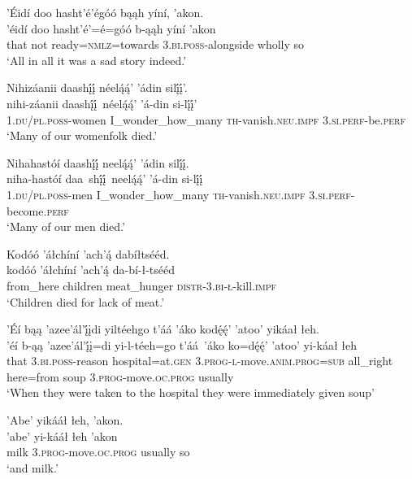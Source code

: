 \ea\label{ex:text7-14-11}
’Éidí doo hasht’é’égóó bąąh yíní, ’akon.\\
\gll ’éidí	doo	hasht’é’=é=góó	b-ąąh	yíní	’akon\\
     that	not	ready=\textsc{nmlz}=towards	3.\textsc{bi}.\textsc{poss}-alongside	wholly	so\\
\glt `All in all it was a sad story indeed.'
\z

\ea\label{ex:text7-14-12}
Nihizáanii daashį́į́ néelą́ą́’ ’ádin silį́į́’.\\
\gll nihi-záanii	daashį́į́~{néelą́ą́’}	’á-din	si-lį́į́’\\
     1.\textsc{du}/\textsc{pl}.\textsc{poss}-women	I\_wonder\_how\_many	\textsc{th}-vanish.\textsc{neu}.\textsc{impf}	3.\textsc{si}.\textsc{perf}-be.\textsc{perf}\\
\glt `Many of our womenfolk died.'
\z

\ea\label{ex:text7-14-13}
Nihahastóí daashį́į́ neelą́ą́’ ’ádin silį́į́.\\
\gll niha-hastóí	daa~shį́į́~{neelą́ą́’}	’á-din	si-lį́į́\\
     1.\textsc{du}/\textsc{pl}.\textsc{poss}-men	I\_wonder\_how\_many	\textsc{th}-vanish.\textsc{neu}.\textsc{impf}	3.\textsc{si}.\textsc{perf}-become.\textsc{perf}\\
\glt `Many of our men died.'
\z

\ea\label{ex:text7-14-14}
Kodóó ’áłchíní ’ach’ą́ dabíłtsééd.\\
\gll kodóó	’áłchíní	’ach’ą́	da-bí-ł-tsééd\\
     from\_here	children	meat\_hunger	\textsc{distr}-3.\textsc{bi}-\textsc{ł}-kill.\textsc{impf}\\
\glt `Children died for lack of meat.'
\z

\ea\label{ex:text7-14-15}
’Éí bąą ’azee’ál’į́įdi yiltéehgo t’áá ’áko kodę́ę́’ ’atoo’ yikáał łeh.\\
\gll ’éí	b-ąą	’azee’ál’į́į=di	yi-l-téeh=go	t’áá~{’áko}	ko=dę́ę́’	’atoo’	yi-káał	łeh\\
     that	3.\textsc{bi}.\textsc{poss}-reason	hospital=at.\textsc{gen}	3.\textsc{prog}-\textsc{l}-move.\textsc{anim}.\textsc{prog}=\textsc{sub}	all\_right	here=from	soup	3.\textsc{prog}-move.\textsc{oc}.\textsc{prog}	usually\\
\glt `When they were taken to the hospital they were immediately given soup'
\z

\ea\label{ex:text7-14-16}
’Abe’ yikááł łeh, ’akon.\\
\gll ’abe’	yi-kááł	łeh	’akon\\
     milk	3.\textsc{prog}-move.\textsc{oc}.\textsc{prog}	usually	so\\
\glt `and milk.'
\z


